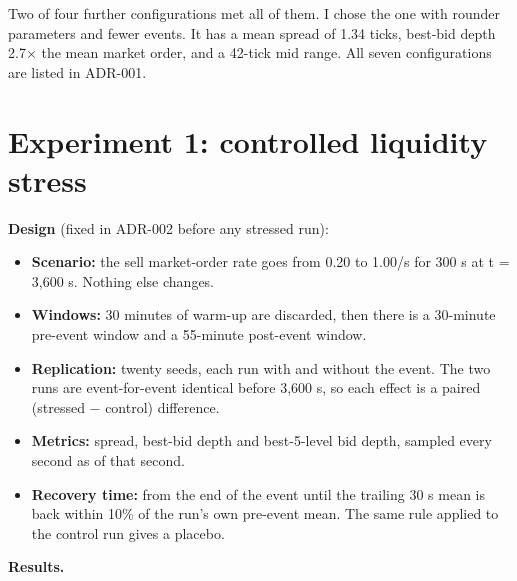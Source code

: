 \documentclass[11pt]{article}
\providecommand{\tightlist}{\setlength{\itemsep}{0pt}\setlength{\parskip}{0pt}}
\begin{document}
Two of four further configurations met all of them. I chose the one
with rounder parameters and fewer events. It has a mean spread of 1.34
ticks, best-bid depth 2.7× the mean market order, and a 42-tick mid
range. All seven configurations are listed in
ADR-001.

\hypertarget{experiment-1-controlled-liquidity-stress}{%
\section{Experiment 1: controlled liquidity stress}\label{experiment-1-controlled-liquidity-stress}}

\textbf{Design} (fixed in ADR-002 before any stressed run):

\begin{itemize}
\tightlist
\item
  \textbf{Scenario:} the sell market-order rate goes from 0.20 to 1.00/s for
  300 s at t = 3,600 s. Nothing else changes.
\item
  \textbf{Windows:} 30 minutes of warm-up are discarded, then there is a
  30-minute pre-event window and a 55-minute post-event window.
\item
  \textbf{Replication:} twenty seeds, each run with and without the event.
  The two runs are event-for-event identical before 3,600 s, so each
  effect is a paired (stressed − control) difference.
\item
  \textbf{Metrics:} spread, best-bid depth and best-5-level bid depth, sampled
  every second as of that second.
\item
  \textbf{Recovery time:} from the end of the event until the trailing 30 s
  mean is back within 10\% of the run's own pre-event mean. The same rule
  applied to the control run gives a placebo.
\end{itemize}

\textbf{Results.}
\end{document}
